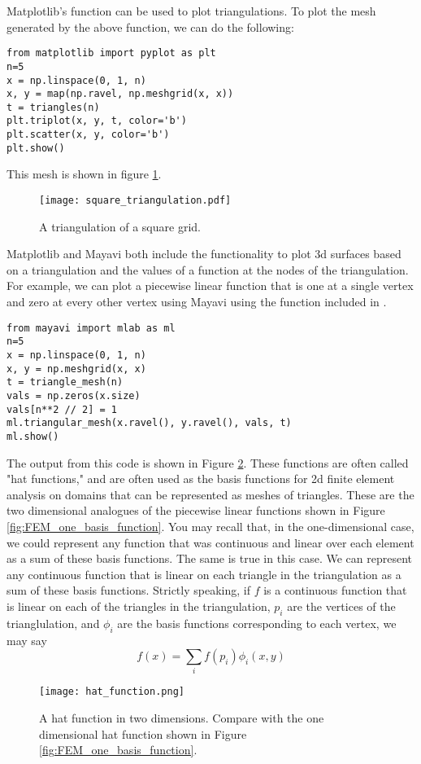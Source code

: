 Matplotlib's  function can be used to plot triangulations.
To plot the mesh generated by the above function, we can do the following:
\begin{lstlisting}
from matplotlib import pyplot as plt
n=5
x = np.linspace(0, 1, n)
x, y = map(np.ravel, np.meshgrid(x, x))
t = triangles(n)
plt.triplot(x, y, t, color='b')
plt.scatter(x, y, color='b')
plt.show()
\end{lstlisting}
This mesh is shown in figure \ref{fig:fem2d_square_triangulation}.

\begin{figure}
\texttt{[image: square\_triangulation.pdf]}
\caption{A triangulation of a square grid.}
\label{fig:fem2d_square_triangulation}
\end{figure}

Matplotlib and Mayavi both include the functionality to plot 3d surfaces based on a triangulation and the values of a function at the nodes of the triangulation.
For example, we can plot a piecewise linear function that is one at a single vertex and zero at every other vertex using Mayavi using the  function included in .
\begin{lstlisting}
from mayavi import mlab as ml
n=5
x = np.linspace(0, 1, n)
x, y = np.meshgrid(x, x)
t = triangle_mesh(n)
vals = np.zeros(x.size)
vals[n**2 // 2] = 1
ml.triangular_mesh(x.ravel(), y.ravel(), vals, t)
ml.show()
\end{lstlisting}
The output from this code is shown in Figure \ref{fig:fem2d_basis_functions}.
These functions are often called "hat functions," and are often used as the basis functions for 2d finite element analysis on domains that can be represented as meshes of triangles.
These are the two dimensional analogues of the piecewise linear functions shown in Figure \ref{fig:FEM_one_basis_function}.
You may recall that, in the one-dimensional case, we could represent any function that was continuous and linear over each element as a sum of these basis functions.
The same is true in this case.
We can represent any continuous function that is linear on each triangle in the triangulation as a sum of these basis functions.
Strictly speaking, if $f$ is a continuous function that is linear on each of the triangles in the triangulation, $p_i$ are the vertices of the trianglulation, and $\phi_i$ are the basis functions corresponding to each vertex, we may say
\[f(x) = \sum_{i} f(p_i) \phi_i(x, y)\]

\begin{figure}
\texttt{[image: hat\_function.png]}
\caption{A hat function in two dimensions. Compare with the one dimensional hat function shown in Figure \ref{fig:FEM_one_basis_function}.}
\label{fig:fem2d_basis_functions}
\end{figure}

